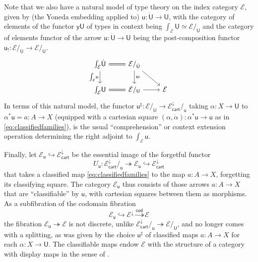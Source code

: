 \documentclass[12pt,reqno]{amsart}
\newcommand{\EE}{\ensuremath{\mathcal{E}}}
\newcommand{\y}{\ensuremath{\mathsf{y}}} %
\newcommand{\hook}{\ensuremath{\hookrightarrow}}
\renewcommand{\epi}{\ensuremath{\twoheadrightarrow}}
\renewcommand{\to}{\ensuremath{\rightarrow}}
\renewcommand{\u}{\ensuremath{\mathsf{u}}}
\renewcommand{\t}{\ensuremath{\mathsf{u}}}
\newcommand{\T}{\ensuremath{\mathsf{U}}}
\newcommand{\TT}{\ensuremath{\dot{\mathsf{U}}}}
\theoremstyle{remark}
\theoremstyle{definition}
\begin{document}
Note that we also have a natural model of type theory on the index category $\EE$, given by (the Yoneda embedding applied to) $\t: \TT \to \T$, with the category of elements of the functor $\y\T$ of types in context being $\int_{\EE}\!\T \simeq \EE/_\T$ and the category of elements functor of the arrow $\t: \TT \to \T$ being the post-composition functor $\t_{!} : \EE/_{\TT} \to \EE/_{\T}$.
 \begin{equation}\label{eq:sliceadjunctionelements}
\begin{tikzcd}
\int_{\EE}\!\TT \ar[d,swap, "{\int_{\EE}\!\t}"] \ar[r, equals] & \EE/_{\TT} \ar[d, "{\t_{!}}"] \ar[rd] & \\
 \int_{\EE}\!\T \ar[r,equals] &  \EE/_\T \ar[r] & \EE
 \end{tikzcd}
 \end{equation}
 In terms of this natural model, the functor $\t^{\sharp} : \EE/_\T \to \EE^{\downarrow}_{\mathsf{cart}}/_{\t}$ taking $\alpha : X \to \T$ to $\alpha^*\t = a: A \to X$ (equipped with a cartesian square $(\alpha, \dot{\alpha}) : \alpha^*\t \to \t$ as in \eqref{eq:classifiedfamilies}), is the usual ``comprehension'' or context extension operation determining the right adjoint to $\int_{\EE}\!\t$.
 
Finally, let $\EE_\t \hook  \EE^{\downarrow}_{\mathsf{cart}}$ be the essential image of the forgetful functor 
\[
U_\t :  \EE^{\downarrow}_{\mathsf{cart}}/_{\t} \twoheadrightarrow \EE_\t \hook \EE^{\downarrow}_{\mathsf{cart}}
\]
that takes a classified map \eqref{eq:classifiedfamilies} to the map $a : A \to X$, forgetting its classifying square.  
The category $\EE_\t$ thus consists of those arrows $a:A \to X$ that are ``classifiable'' by $\t$, with cartesian squares between them as morphisms. As a subfibration of the codomain fibration 
\[
\EE_\t \hook \EE^\downarrow \stackrel{\mathsf{cod}}{\epi} \EE
\]
 the fibration $\EE_\t \epi \EE$ is not discrete, unlike $\EE^{\downarrow}_{\mathsf{cart}}/_{\t} \twoheadrightarrow \EE/_\T$, and %
no longer comes with a splitting, as was given by the choice $\u^\sharp$ of classified maps $a : A\to X$ for each $\alpha : X \to \T$.  The classifiable maps endow $\EE$ with the structure of a category with display maps in the sense of \cite{Taylor:PFM}.  
\end{document}
